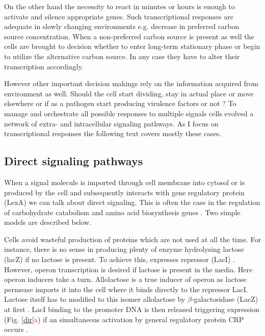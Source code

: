 On the other hand the necessity to react in minutes or hours is enough to activate and silence appropriate genes.
Such transcriptional responses are adequate in slowly changing environments e.g. decrease in preferred carbon source concentration.
When a non-preferred carbon source is present as well the cells are brought to decision whether to enter long-term stationary phase or begin to utilize the alternative carbon source.
In any case they have to alter their transcription accordingly.

However other important decision makings rely on the information acquired from environment as well.
Should the cell start dividing, stay in actual place or move elsewhere or if as a pathogen start producing virulence factors or not \cite{gottesman2003proteolysis, sourjik2012responding, cui2018novel}?
To manage and orchestrate all possible responses to multiple signals cells evolved a network of extra- and intracellular signaling pathways.
As I focus on transcriptional responses the following text covers mostly these cases.

\subsection{Direct signaling pathways}
When a signal molecule is imported through cell membrane into cytosol or is produced by the cell and subsequently interacts 
with gene regulatory protein (LexA) we can talk about direct signaling.
This is often the case in the regulation of carbohydrate catabolism and amino acid biosynthesis genes \cite{charlier1992arginine, weickert1992isorepressor, pittard1996various, wheatley2013structural}.
Two simple models are described below.

Cells avoid wasteful production of proteins which are not used at all the time.
For instance, there is no sense in producing plenty of enzyme hydrolysing lactose (lacZ) if no lactose is present.
To achieve this,  expresses  repressor (LacI) \cite{hudson1990co}.
However,  operon transcription is desired if lactose is present in the media.
Here  operon inducers take a turn.
Allolactose is a true inducer of  operon as lactose permease imports it into the cell where it binds directly to the repressor LacI.
Lactose itself has to modified to this isomer allolactose by $\beta$-galactosidase (LacZ) at first \cite{jobe1972lac, wheatley2013structural}.
LacI binding to the promoter DNA is then released triggering  expression (Fig. \ref{dir}\textcolor{red}{a}) if an simultaneous activation by general regulatory protein CRP occurs \cite{hudson1990co, clark2005molecular}.

